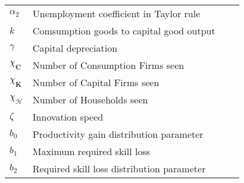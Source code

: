 \documentclass[a4paper, headings=standardclasses]{scrartcl}
\begin{document}
\begin{tabularx}{\linewidth}{lXll}
	$\alpha_2$         & Unemployment coefficient in Taylor rule                   &       &        \\
	$k$                & Comsumption goods to capital good output                  &       &        \\
	$\gamma$           & Capital depreciation                                      &       &        \\
	$\chi_\mathbf{C}$  & Number of Consumption Firms seen                          &       &        \\
	$\chi_\mathbf{K}$  & Number of Capital Firms seen                              &       &        \\
	$\chi_\mathcal{H}$ & Number of Households seen                                 &       &        \\
	$\zeta$            & Innovation speed                                          &       &        \\
	$b_0$              & Productivity gain distribution parameter                  &       &        \\
	$b_1$              & Maximum required skill loss                               &       &        \\
	$b_2$              & Required skill loss distribution parameter                &       &        \\


	\bottomrule
\end{tabularx}





\printbibliography
\end{document}
